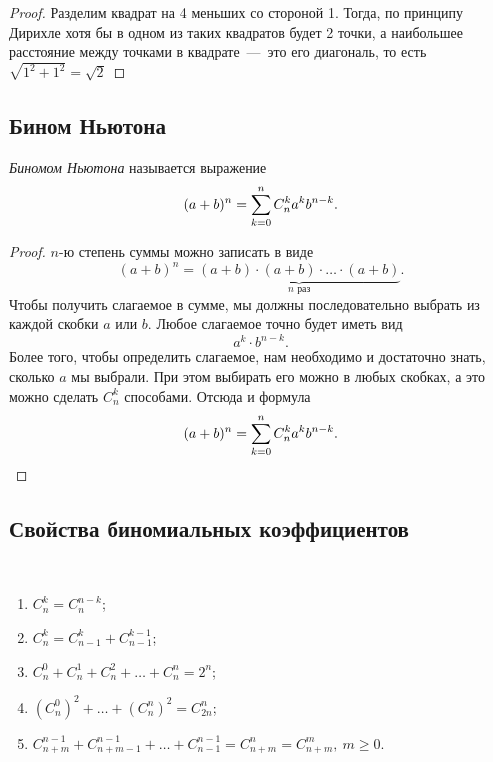 \begin{proof}
	Разделим квадрат на 4 меньших со стороной 1. Тогда, по принципу Дирихле хотя бы в одном из таких квадратов будет 2 точки, а наибольшее расстояние между точками в квадрате~---~это его диагональ, то есть $\sqrt{1^2 + 1^2} = \sqrt{2}$
\end{proof}

\subsection{Бином Ньютона}

\begin{definition}
	\textit{Биномом Ньютона} называется выражение
	\[
		(a + b)^n = \sum\limits_{k = 0}^n C_n^k a^k b^{n - k}.
	\]
\end{definition}

\begin{proof}
	$n$-ю степень суммы можно записать в виде
	\[
		(a + b)^n = \underbrace{(a + b) \cdot (a + b) \cdot \ldots \cdot (a + b)}_{n \text{ раз}}.
	\]
	Чтобы получить слагаемое в сумме, мы должны последовательно выбрать из каждой скобки $a$ или $b$. Любое слагаемое точно будет иметь вид
	\[
		a^k \cdot b^{n - k}.
	\]
	Более того, чтобы определить слагаемое, нам необходимо и достаточно знать, сколько $a$ мы выбрали. При этом выбирать его можно в любых скобках, а это можно сделать $C_n^k$ способами. Отсюда и формула
	\[
		(a + b)^n = \sum\limits_{k = 0}^n C_n^k a^k b^{n - k}.
	\]
\end{proof}

\subsection{Свойства биномиальных коэффициентов}

\begin{theorem}~
	\begin{enumerate}
		\item $C_n^k = C_n^{n - k}$;
		\item $C_n^k = C_{n - 1}^k + C_{n - 1}^{k - 1}$;
		\item $C_n^0 + C_n^1 + C_n^2 + \ldots + C_n^n = 2^n$;
		\item $\left(C_n^0\right)^2 + \ldots + \left(C_n^n\right)^2 = C_{2n}^n$;
		\item $C_{n + m}^{n - 1} + C_{n + m - 1}^{n - 1} + \ldots + C_{n - 1}^{n - 1} = C_{n + m}^n = C_{n + m}^m,\ m \ge 0$.
	\end{enumerate}
\end{theorem}

